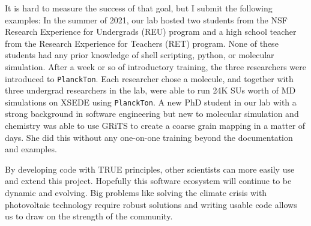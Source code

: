 It is hard to measure the success of that goal, but I submit the following examples:
In the summer of 2021, our lab hosted two students from the NSF Research Experience for Undergrads (REU) program and a high school teacher from the Research Experience for Teachers (RET) program. 
None of these students had any prior knowledge of shell scripting, python, or molecular simulation. 
After a week or so of introductory training, the three researchers were introduced to \texttt{PlanckTon}. 
Each researcher chose a molecule, and together with three undergrad researchers in the lab, were able to run 24K SUs worth of MD simulations on XSEDE using \texttt{PlanckTon}. 
A new PhD student in our lab with a strong background in software engineering but new to molecular simulation and chemistry was able to use GRiTS to create a coarse grain mapping in a matter of days. 
She did this without any one-on-one training beyond the documentation and examples.

By developing code with TRUE principles, other scientists can more easily use and extend this project.
Hopefully this software ecosystem will continue to be dynamic and evolving. 
Big problems like solving the climate crisis with photovoltaic technology require robust solutions and writing usable code allows us to draw on the strength of the community. 